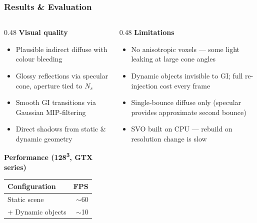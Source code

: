 \documentclass{beamer}
\begin{document}
\begin{frame}
\frametitle{Results \& Evaluation}

\begin{columns}[T]
    \begin{column}{0.48\textwidth}
        \textbf{Visual quality}
        \begin{itemize}
            \item Plausible indirect diffuse with colour bleeding
            \item Glossy reflections via specular cone, aperture tied to $N_s$
            \item Smooth GI transitions via Gaussian MIP-filtering
            \item Direct shadows from static \& dynamic geometry
        \end{itemize}
        \vspace{0.4em}
        \textbf{Performance (128\textsuperscript{3}, GTX series)}
        \begin{tabular}{lr}
            \toprule
            Configuration & FPS \\
            \midrule
            Static scene & $\sim$60 \\
            + Dynamic objects & $\sim$10 \\
            \bottomrule
        \end{tabular}
    \end{column}
    \begin{column}{0.48\textwidth}
        \textbf{Limitations}
        \begin{itemize}
            \item No anisotropic voxels — some light leaking at large cone angles
            \item Dynamic objects invisible to GI; full re-injection cost every frame
            \item Single-bounce diffuse only (specular provides approximate second bounce)
            \item SVO built on CPU — rebuild on resolution change is slow
        \end{itemize}
    \end{column}
\end{columns}

\end{frame}

\end{document}
